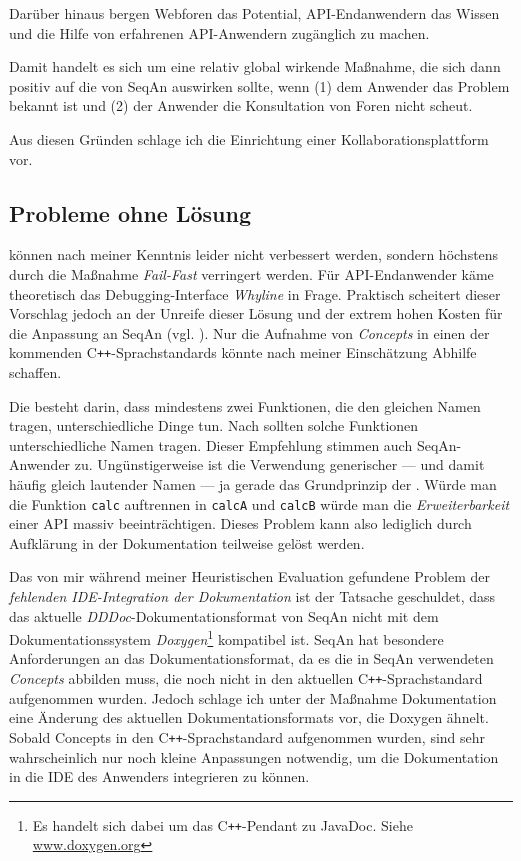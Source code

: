 Darüber hinaus bergen Webforen das Potential, API-Endanwendern das Wissen und die Hilfe von erfahrenen API-Anwendern zugänglich zu machen. \citep{Ko:2005cl}

Damit handelt es sich um eine relativ global wirkende Maßnahme, die sich dann positiv auf die  von SeqAn auswirken sollte, wenn (1) dem Anwender das Problem bekannt ist und (2) der Anwender die Konsultation von Foren nicht scheut. 

Aus diesen Gründen schlage ich die Einrichtung einer Kollaborationsplattform vor.





\subsection{Probleme ohne Lösung}

 können nach meiner Kenntnis leider nicht verbessert werden, sondern höchstens durch die Maßnahme \textit{Fail-Fast} verringert werden. Für API-Endanwender käme theoretisch das Debugging-Interface \textit{Whyline} \citep{Ko:2004fc} in Frage. Praktisch scheitert dieser Vorschlag jedoch an der Unreife dieser Lösung und der extrem hohen Kosten für die Anpassung an SeqAn (vgl. ). Nur die Aufnahme von \textit{Concepts} in einen der kommenden C\texttt{++}-Sprachstandards könnte nach meiner Einschätzung Abhilfe schaffen.
        
Die  besteht darin, dass mindestens zwei Funktionen, die den gleichen Namen tragen, unterschiedliche Dinge tun. Nach \cite{Bloch:2006jk} sollten solche Funktionen unterschiedliche Namen tragen. Dieser Empfehlung stimmen auch SeqAn-Anwender zu. Ungünstigerweise ist die Verwendung generischer --- und damit häufig gleich lautender Namen --- ja gerade das Grundprinzip der . Würde man die Funktion \texttt{calc} auftrennen in \texttt{calcA} und \texttt{calcB} würde man die \textit{Erweiterbarkeit} einer API massiv beeinträchtigen. Dieses Problem kann also lediglich durch Aufklärung in der Dokumentation teilweise gelöst werden.

Das von mir während meiner Heuristischen Evaluation gefundene Problem der \textit{fehlenden IDE-Integration der Dokumentation} ist der Tatsache geschuldet, dass das aktuelle \textit{DDDoc}-Dokumentationsformat von SeqAn nicht mit dem Dokumentationssystem \textit{Doxygen}\footnote{Es handelt sich dabei um das C\texttt{++}-Pendant zu JavaDoc. Siehe \url{www.doxygen.org}} kompatibel ist. SeqAn hat besondere Anforderungen an das Dokumentationsformat, da es die in SeqAn verwendeten \textit{Concepts} abbilden muss, die noch nicht in den aktuellen C\texttt{++}-Sprachstandard aufgenommen wurden. Jedoch schlage ich unter der Maßnahme Dokumentation eine Änderung des aktuellen Dokumentationsformats vor, die Doxygen ähnelt. Sobald Concepts in den C\texttt{++}-Sprachstandard aufgenommen wurden, sind sehr wahrscheinlich nur noch kleine Anpassungen notwendig, um die Dokumentation in die IDE des Anwenders integrieren zu können.

